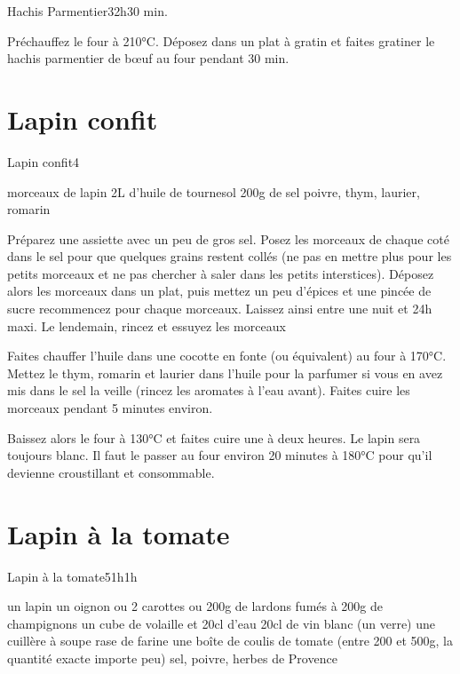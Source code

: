 {\begin{recette}{Hachis Parmentier}{3}{2h}{30 min.}
\begin{cuisson}
Préchauffez le four à 210°C. Déposez dans un plat à gratin et faites gratiner le hachis parmentier de bœuf au four pendant 30 min.
\end{cuisson}
\end{recette}

\section{Lapin confit}
\begin{recette}{Lapin confit}{4}{}{}
\begin{ingredients}
\ingredient morceaux de lapin
\ingredient 2L d'huile de tournesol
\ingredient 200g de sel
\ingredient poivre, thym, laurier, romarin
\end{ingredients}

\begin{preparation}
\etape Préparez une assiette avec un peu de gros sel. Posez les morceaux de chaque coté dans le sel pour que quelques grains restent collés (ne pas en mettre plus pour les petits morceaux et ne pas chercher à saler dans les petits interstices). Déposez alors les morceaux dans un plat, puis mettez un peu d'épices et une pincée de sucre
\etape recommencez pour chaque morceaux. Laissez ainsi entre une nuit et 24h maxi. 
\etape Le lendemain, rincez et essuyez les morceaux
\end{preparation}

\begin{cuisson}
Faites chauffer l'huile dans une cocotte en fonte (ou équivalent) au four à 170°C. Mettez le thym, romarin et laurier dans l'huile pour la parfumer si vous en avez mis dans le sel la veille (rincez les aromates à l'eau avant). Faites cuire les morceaux pendant 5 minutes environ. 

Baissez alors le four à 130°C et faites cuire une à deux heures. Le lapin sera toujours blanc. Il faut le passer au four environ 20 minutes à 180°C pour qu'il devienne croustillant et consommable.
\end{cuisson}
\end{recette}

\section{Lapin à la tomate}
\begin{recette}{Lapin à la tomate}{5}{1h}{1h}
\begin{ingredients}[4 pers.]
\ingredient un lapin
\ingredient un oignon
 ou 2 carottes
 ou 200g de lardons fumés
 à 200g de champignons
\ingredient un cube de volaille et 20cl d'eau
\ingredient 20cl de vin blanc (un verre)
\ingredient une cuillère à soupe rase de farine
\ingredient une boîte de coulis de tomate (entre 200 et 500g, la quantité exacte importe peu)
\ingredient sel, poivre, herbes de Provence
\end{ingredients}


\end{recette}}
